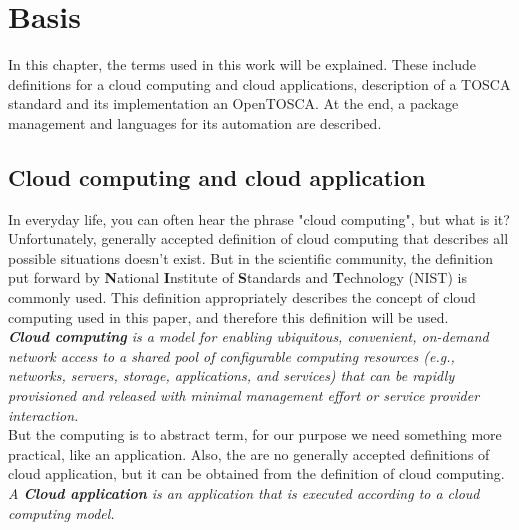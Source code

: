 
\chapter{Basis}
\label{chap:basis}
In this chapter, the terms used in this work will be explained.
These include definitions for a cloud computing and cloud applications, description of a TOSCA standard and its implementation an OpenTOSCA.
At the end, a package management and languages for its automation are described.
\section{Cloud computing and cloud application} \label{sec:cloud}
In everyday life, you can often hear the phrase "cloud computing", but what is it?\\
Unfortunately, generally accepted definition of cloud computing that describes all possible situations doesn't exist. 
But in the scientific community, the definition put forward by \textbf{N}ational \textbf{I}nstitute of \textbf{S}tandards and \textbf{T}echnology (NIST) is commonly used. 
This definition appropriately describes the concept of cloud computing used in this paper, and therefore this definition will be used.\\
\emph{\textbf{Cloud computing}\label{def:nist} is a model for enabling ubiquitous, convenient, on-demand network access to a shared pool of configurable computing resources (e.g., networks, servers, storage, applications, and services) that can be rapidly provisioned and released with minimal management effort or service provider interaction.}~\cite*{nist}\\
But the computing is to abstract term, for our purpose we need something more practical, like an application.
Also, the are no generally accepted definitions of cloud application, but it can be obtained from the definition of cloud computing.\\
\emph{A \textbf{Cloud application}\label{def:capp} is an application that is executed according to a cloud computing model.} \\%
